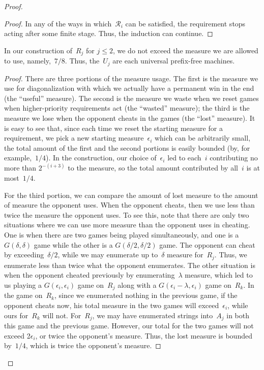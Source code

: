 \documentclass{LMCS}
\newcommand{\0}{\mathbf{0}}
\newcommand{\<}{\langle}
\renewcommand{\>}{\rangle}
\begin{document}
\begin{proof}
\begin{proof}
In any of the ways in which~$\mathcal{R}_i$ can be satisfied, the requirement
stops acting after some finite stage. Thus, the induction can continue.
\end{proof}

\begin{lem}
In our construction of~$R_j$ for $j \le 2$, we do not exceed the measure we
are allowed to use, namely,~$7/8$.  Thus, the~$U_j$ are each universal
prefix-free machines.
\end{lem}

\begin{proof}
There are three portions of the measure usage. The first is the measure we
use for diagonalization with which we actually have a permanent win in the
end (the ``useful'' measure). The second is the measure we waste when we
reset games when higher-priority requirements act (the ``wasted'' measure);
the third is the measure we lose when the opponent cheats in the games (the
``lost'' measure). It is easy to see that, since each time we reset the
starting measure for a requirement, we pick a new starting
measure~$\epsilon_i$ which can be arbitrarily small, the total amount of the
first and the second portions is easily bounded (by, for example,~$1/4$). In
the construction, our choice of~$\epsilon_i$ led to each~$i$ contributing no
more than $2^{-(i+3)}$ to the measure, so the total amount contributed by
all~$i$ is at most~$1/4$.

For the third portion, we can compare the amount of lost measure to the
amount of measure the opponent uses.  When the opponent cheats, then we use
less than twice the measure the opponent uses.  To see this, note that there
are only two situations where we can use more measure than the opponent uses
in cheating.  One is when there are two games being played simultaneously,
and one is a $G(\delta,\delta)$ game while the other is a
$G(\delta/2,\delta/2)$ game.  The opponent can cheat by exceeding~$\delta/2$,
while we may enumerate up to~$\delta$ measure for~$R_j$.  Thus, we enumerate
less than twice what the opponent enumerates.  The other situation is when
the opponent cheated previously by enumerating~$\lambda$ measure, which led
to us playing a $G(\epsilon_i,\epsilon_i)$ game on~$R_j$ along with a
$G(\epsilon_i-\lambda, \epsilon_i)$ game on~$R_k$.  In the game on~$R_k$,
since we enumerated nothing in the previous game, if the opponent cheats now,
his total measure in the two games will exceed~$\epsilon_i$, while ours
for~$R_k$ will not.  For~$R_j$, we may have enumerated strings into~$A_j$ in
both this game and the previous game.  However, our total for the two games
will not exceed 2$\epsilon_i$, or twice the opponent's measure.  Thus, the
lost measure is bounded by~$1/4$, which is twice the opponent's measure.


\end{proof}
\end{proof}
\end{document}
